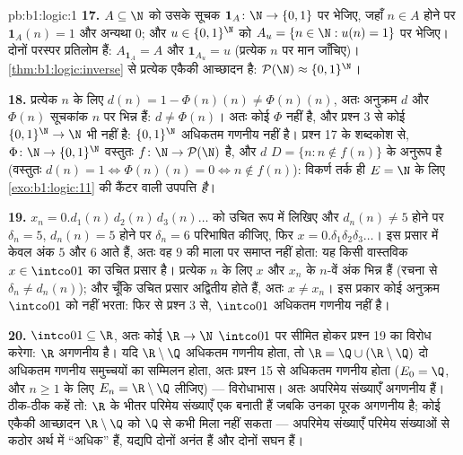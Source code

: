 \begin{solution}{pb:b1:logic:1}
\textbf{17.} $A \subseteq \N$ को उसके सूचक $\mathbf 1_A \colon \N \to
\{0,1\}$ पर भेजिए, जहाँ $n \in A$ होने पर $\mathbf 1_A(n) = 1$ और अन्यथा
$0$; और $u \in \{0,1\}^{\N}$ को $A_u = \{n \in \N : u(n) = 1\}$ पर भेजिए।
दोनों  परस्पर प्रतिलोम हैं: $A_{\mathbf 1_A} = A$ और $\mathbf
1_{A_u} = u$ (प्रत्येक $n$ पर मान जाँचिए)। \cref{thm:b1:logic:inverse} से
प्रत्येक एकैकी आच्छादन है: $\mathcal{P}(\N) \approx \{0,1\}^{\N}$।

\textbf{18.} प्रत्येक $n$ के लिए $d(n) = 1 - \Phi(n)(n) \neq \Phi(n)(n)$,
अतः अनुक्रम $d$ और $\Phi(n)$ सूचकांक $n$ पर भिन्न हैं: $d \neq \Phi(n)$। अतः
कोई $\Phi$  नहीं है, और प्रश्न 3 से कोई  
$\{0,1\}^{\N} \to \N$ भी नहीं है: $\{0,1\}^{\N}$ अधिकतम गणनीय नहीं है।
प्रश्न 17 के शब्दकोश से,  $\Phi \colon \N \to \{0,1\}^{\N}$
वस्तुतः  $f \colon \N \to \mathcal{P}(\N)$ है, और $d$  $D
= \{n : n \notin f(n)\}$ के अनुरूप है (वस्तुतः $d(n) = 1 \iff \Phi(n)(n) = 0
\iff n \notin f(n)$): विकर्ण तर्क ही $E = \N$ के लिए \cref{exo:b1:logic:11}
की कैंटर वाली उपपत्ति \emph{है}।

\textbf{19.} $x_n = 0.d_1(n)\,d_2(n)\,d_3(n)\dots$ को उचित रूप में लिखिए और
$d_n(n) \neq 5$ होने पर $\delta_n = 5$, $d_n(n) = 5$ होने पर $\delta_n = 6$
परिभाषित कीजिए, फिर $x = 0.\delta_1\delta_2\delta_3\dots$। इस प्रसार में
केवल अंक $5$ और $6$ आते हैं, अतः वह $9$ की माला पर समाप्त नहीं होता: यह किसी
वास्तविक $x \in \intco01$ का उचित प्रसार है। प्रत्येक $n$ के लिए $x$ और
$x_n$ के $n$-वें अंक भिन्न हैं (रचना से $\delta_n \neq d_n(n)$); और चूँकि
उचित प्रसार अद्वितीय होते हैं, अतः $x \neq x_n$। इस प्रकार कोई अनुक्रम
$\intco01$ को नहीं भरता: फिर से प्रश्न 3 से, $\intco01$ अधिकतम गणनीय नहीं
है।

\textbf{20.} $\intco01 \subseteq \R$, अतः कोई   $\R \to \N$
$\intco01$ पर सीमित होकर प्रश्न 19 का विरोध करेगा: $\R$ अगणनीय है। यदि $\R
\setminus \Q$ अधिकतम गणनीय होता, तो $\R = \Q \cup (\R \setminus \Q)$ दो
अधिकतम गणनीय समुच्चयों का सम्मिलन होता, अतः प्रश्न 15 से अधिकतम गणनीय होता
($E_0 = \Q$, और $n \geq 1$ के लिए $E_n = \R \setminus \Q$ लीजिए) ---
विरोधाभास। अतः अपरिमेय संख्याएँ अगणनीय हैं। ठीक-ठीक कहें तो: $\R$ के भीतर
परिमेय संख्याएँ एक  बनाती हैं जबकि उनका पूरक अगणनीय है; कोई
एकैकी आच्छादन $\R \setminus \Q$ को $\Q$ से कभी मिला नहीं सकता --- अपरिमेय
संख्याएँ परिमेय संख्याओं से कठोर अर्थ में ``अधिक'' हैं, यद्यपि दोनों अनंत
हैं और दोनों सघन हैं।


\end{solution}

